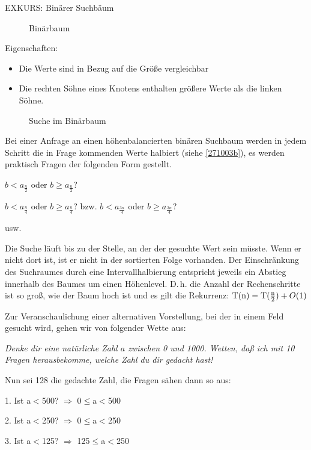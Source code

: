 \documentclass[ngerman]{scrreprt}%
\theoremstyle{break}
\begin{document}
EXKURS: Binärer Suchbäum
\begin{figure}[H]
	\centering
	\caption{Binärbaum}
	\label{271003a}
\end{figure}

Eigenschaften:
\begin{itemize}
	\item Die Werte sind in Bezug auf die Größe vergleichbar
	\item Die rechten Söhne eines Knotens enthalten größere Werte als die linken Söhne.
\end{itemize}

\begin{figure}
	\centering
	\caption{Suche im Binärbaum}
	\label{271003b}
\end{figure}

Bei einer Anfrage an einen höhenbalancierten binären Suchbaum werden in jedem Schritt die in Frage kommenden Werte halbiert (siehe \autoref{271003b}), es
werden praktisch Fragen der folgenden Form gestellt.

 \quad \( b < a_{\frac{n}{2}} \) oder \( b \geq a_{\frac{n}{2}} \)?
 
 \quad \( b < a_{\frac{n}{4}} \) oder \( b \geq a_{\frac{n}{4}} \)? bzw. \( b < a_{\frac{3n}{4}} \) oder \( b \geq a_{\frac{3n}{4}} \)?

 \quad usw. 
 
Die Suche läuft bis zu der Stelle, an der der gesuchte Wert sein müsste. Wenn er nicht dort ist, ist er nicht in der sortierten Folge
vorhanden.
%
Der Einschränkung des Suchraumes durch eine Intervallhalbierung entspricht jeweils ein Abstieg innerhalb des Baumes um einen
Höhenlevel.
D.\,h. die Anzahl der Rechenschritte ist so groß, wie der Baum hoch ist und es gilt die Rekurrenz: 
\(\textup{T}(\textup{n})=\textup{T}(\frac{\textup{n}}{2}) + O(1)\)

Zur Veranschaulichung einer alternativen Vorstellung, bei der in einem Feld gesucht wird, gehen wir von folgender Wette aus:

\textit{Denke dir eine natürliche Zahl $a$ zwischen 0 und 1000. Wetten, daß ich mit 10 Fragen herausbekomme, welche Zahl du dir gedacht
hast!}

Nun sei 128 die gedachte Zahl, die Fragen sähen dann so aus:

1. Ist a$<$500? $\Rightarrow$ 0$\leq$a$<$500

2. Ist a$<$250? $\Rightarrow$ 0$\leq$a$<$250

3. Ist a$<$125? $\Rightarrow$ 125$\leq$a$<$250
\end{document}
